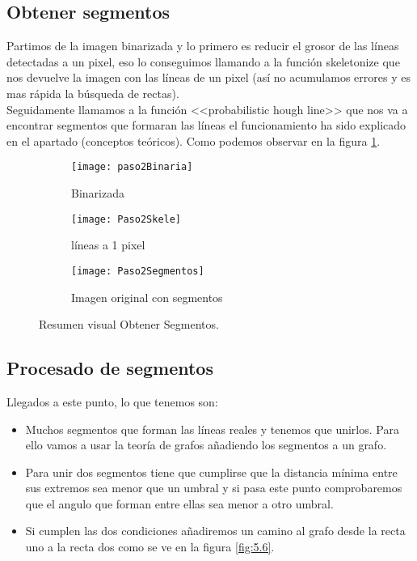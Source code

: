 \subsection{Obtener segmentos}
Partimos de la imagen binarizada y lo primero es reducir el grosor de las líneas detectadas a un pixel, eso lo conseguimos llamando a la función skeletonize que nos devuelve la imagen con las líneas de un pixel (así no acumulamos errores y es mas rápida la búsqueda de rectas).\\
Seguidamente llamamos a la función <<probabilistic hough line>> que nos va a encontrar segmentos que formaran las líneas el funcionamiento ha sido explicado en el apartado (conceptos teóricos). Como podemos observar en la figura \ref{fig:5.5}.


\begin{figure}
\begin{subfigure}[c]{.5\linewidth}
\centering\large \texttt{[image: paso2Binaria]}
\caption{Binarizada}
\end{subfigure}%
\begin{subfigure}[c]{.5\linewidth}
\centering\large \texttt{[image: Paso2Skele]}
\caption{líneas a 1 pixel}
\end{subfigure}
\begin{subfigure}[c]{.5\linewidth}
\centering\large \texttt{[image: Paso2Segmentos]}
\caption{Imagen original con segmentos}
\end{subfigure}
\caption{Resumen visual Obtener Segmentos.}\label{fig:5.5}
\end{figure}

\subsection{Procesado de segmentos}
Llegados a este punto, lo que tenemos son:
\begin{itemize}
\item Muchos segmentos que forman las líneas reales y tenemos que unirlos. Para ello vamos a usar la teoría de grafos añadiendo los segmentos a un grafo.

\item Para unir dos segmentos tiene que cumplirse que la distancia mínima entre sus extremos sea menor que un umbral y si pasa este punto comprobaremos que el angulo que forman entre ellas sea menor a otro umbral.

\item Si cumplen las dos condiciones añadiremos un camino al grafo desde la recta uno a la recta dos como se ve en la figura \ref{fig:5.6}.
\end{itemize}


